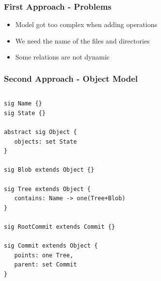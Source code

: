 \documentclass{beamer}
\begin{document}
\begin{frame}[fragile]
   \frametitle{First Approach - Problems}
      \begin{itemize}
         \item Model got too complex when adding operations
         \item We need the name of the files and directories
         \item Some relations are not dynamic
      \end{itemize}
\end{frame}


\begin{frame}[fragile]
   \frametitle{Second Approach - Object Model}
   \tiny
   \begin{columns}[c]
      \column{1.5in}
   \begin{lstlisting}
sig Name {}
sig State {}

abstract sig Object {
   objects: set State
}

sig Blob extends Object {}

sig Tree extends Object {
   contains: Name -> one(Tree+Blob)
}

sig RootCommit extends Commit {}

sig Commit extends Object {
   points: one Tree,
   parent: set Commit
}

\end{lstlisting}
   \column{1.5in}
   \end{columns}

\end{frame}
\end{document}
